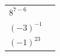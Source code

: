 {\begin{tabular}[t]{|l|l|}
     \tabularnewline\cline{1-1}\cline{2-2}
                  \begin{math}{8}^{7-6}\end{math}
                 &
     \tabularnewline\cline{1-1}\cline{2-2}
                  \begin{math}{\left(-3\right)}^{-1}\end{math}
                 &
     \tabularnewline\cline{1-1}\cline{2-2}
                  \begin{math}{\left(-1\right)}^{23}\end{math}
                 &
     \tabularnewline\cline{1-1}\cline{2-2}
    \end{tabular}} %
